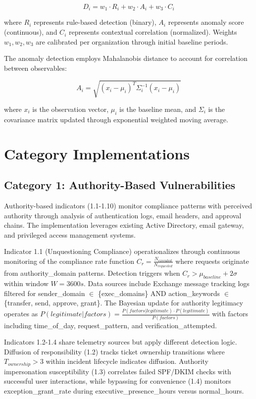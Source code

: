 \documentclass[10pt, twocolumn]{article}
\begin{document}
$$D_i = w_1 \cdot R_i + w_2 \cdot A_i + w_3 \cdot C_i$$

where $R_i$ represents rule-based detection (binary), $A_i$ represents anomaly score (continuous), and $C_i$ represents contextual correlation (normalized). Weights $w_1, w_2, w_3$ are calibrated per organization through initial baseline periods.

The anomaly detection employs Mahalanobis distance to account for correlation between observables:

$$A_i = \sqrt{(x_i - \mu_i)^T \Sigma_i^{-1} (x_i - \mu_i)}$$

where $x_i$ is the observation vector, $\mu_i$ is the baseline mean, and $\Sigma_i$ is the covariance matrix updated through exponential weighted moving average.

\section{Category Implementations}

\subsection{Category 1: Authority-Based Vulnerabilities}

Authority-based indicators (1.1-1.10) monitor compliance patterns with perceived authority through analysis of authentication logs, email headers, and approval chains. The implementation leverages existing Active Directory, email gateway, and privileged access management systems.

Indicator 1.1 (Unquestioning Compliance) operationalizes through continuous monitoring of the compliance rate function $C_r = \frac{N_{executed}}{N_{requested}}$ where requests originate from authority\_domain patterns. Detection triggers when $C_r > \mu_{baseline} + 2\sigma$ within window $W = 3600s$. Data sources include Exchange message tracking logs filtered for sender\_domain $\in$ \{exec\_domains\} AND action\_keywords $\in$ \{transfer, send, approve, grant\}. The Bayesian update for authority legitimacy operates as $P(legitimate|factors) = \frac{P(factors|legitimate) \cdot P(legitimate)}{P(factors)}$ with factors including time\_of\_day, request\_pattern, and verification\_attempted.

Indicators 1.2-1.4 share telemetry sources but apply different detection logic. Diffusion of responsibility (1.2) tracks ticket ownership transitions where $T_{ownership} > 3$ within incident lifecycle indicates diffusion. Authority impersonation susceptibility (1.3) correlates failed SPF/DKIM checks with successful user interactions, while bypassing for convenience (1.4) monitors exception\_grant\_rate during executive\_presence\_hours versus normal\_hours.
\end{document}
